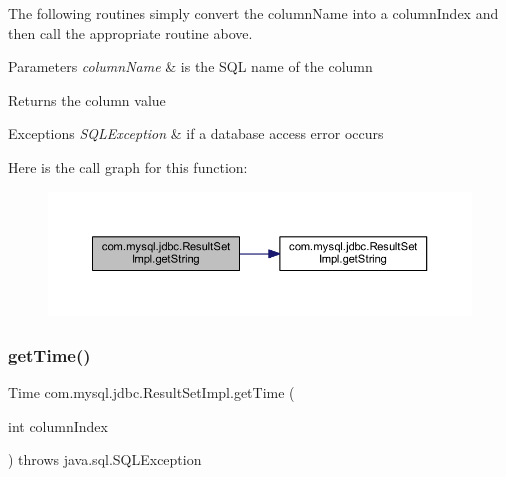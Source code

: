 The following routines simply convert the column\+Name into a column\+Index and then call the appropriate routine above.


\begin{DoxyParams}{Parameters}
{\em column\+Name} & is the S\+QL name of the column\\
\hline
\end{DoxyParams}
\begin{DoxyReturn}{Returns}
the column value
\end{DoxyReturn}

\begin{DoxyExceptions}{Exceptions}
{\em S\+Q\+L\+Exception} & if a database access error occurs \\
\hline
\end{DoxyExceptions}
Here is the call graph for this function\+:
\nopagebreak
\begin{figure}[H]
\begin{center}
\leavevmode
\includegraphics[width=350pt]{classcom_1_1mysql_1_1jdbc_1_1_result_set_impl_ac3392db13c1e1bd57aa8e641ea282fcf_cgraph}
\end{center}
\end{figure}
\mbox{\label{classcom_1_1mysql_1_1jdbc_1_1_result_set_impl_a8eba20925d3ad454aba811f47ac4de65}} 
\subsubsection{\texorpdfstring{get\+Time()}{getTime()}\hspace{0.1cm}{\footnotesize\ttfamily [1/4]}}
{\footnotesize\ttfamily Time com.\+mysql.\+jdbc.\+Result\+Set\+Impl.\+get\+Time (\begin{DoxyParamCaption}\item[{int}]{column\+Index }\end{DoxyParamCaption}) throws java.\+sql.\+S\+Q\+L\+Exception}

